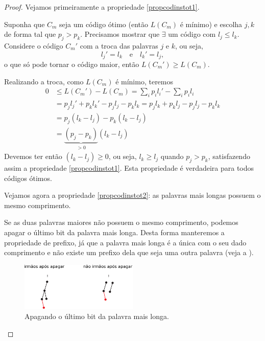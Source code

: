 \begin{proof}
Vejamos primeiramente a propriedade \ref{propcodinstot1}.

Suponha que $C_m$ seja um código ótimo (então $L(C_m)$ é mínimo) e escolha $j,k$ de forma tal que $p_j > p_k$.
Precisamos mostrar que $\exists$ um código com $l_j \leq l_k$.
Considere o código $C_m'$ com a troca das palavras $j$ e $k$, ou seja,
\begin{equation}
  l_j' = l_k \quad \text{e} \quad l_k' = l_j ,
\end{equation}
o que só pode tornar o código maior, então $L(C_m') \geq L(C_m)$.

Realizando a troca, como $L(C_m)$ é mínimo, teremos
\begin{subequations}
  \begin{align}
    0 &\leq L(C_m') - L(C_m) = \sum_i p_i l_i' - \sum_i p_i l_i \\
      &= p_j l_j' + p_k l_k' - p_j l_j - p_k l_k = p_j l_k + p_k l_j - p_j l_j - p_k l_k \\
      &= p_j (l_k - l_j) - p_k (l_k - l_j) \\
      &= \underbrace{(p_j - p_k)}_{>0}  (l_k - l_j)
  \end{align}
\end{subequations}
Devemos ter então $(l_k - l_j) \geq 0$, ou seja, $l_k \geq l_j$ quando $p_j > p_k$, satisfazendo assim a propriedade \ref{propcodinstot1}.
Esta propriedade é verdadeira para todos códigos ótimos.

Vejamos agora a propriedade \ref{propcodinstot2}: as palavras mais longas possuem o mesmo comprimento.

Se as duas palavras maiores não possuem o mesmo comprimento, podemos apagar o último bit da palavra mais longa.
Desta forma manteremos a propriedade de prefixo, já que a palavra mais longa é a única com o seu dado comprimento e não
existe um prefixo dela que seja uma outra palavra (veja a ).
 \begin{figure}[h!]
 \centering
 \includegraphics[width=0.5\textwidth]{figures/lemmahuffman.pdf}
 \caption{Apagando o último bit da palavra mais longa.}\label{fig:lemmahuffman}
 \end{figure}


\end{proof}
